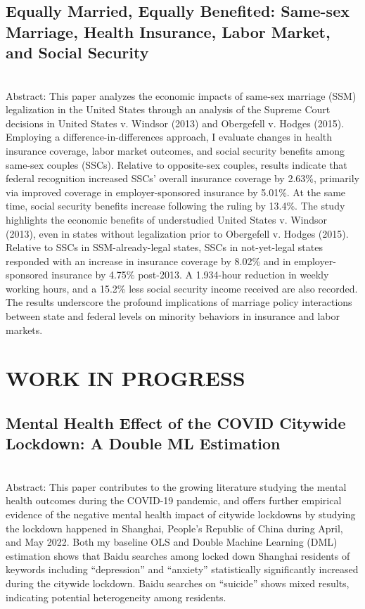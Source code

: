 \documentclass[a4paper,9pt]{extarticle}
\begin{document}
\subsection*{Equally Married, Equally Benefited: Same-sex Marriage, Health Insurance, Labor Market, and Social Security} \\ 
Abstract: This paper analyzes the economic impacts of same-sex marriage (SSM) legalization in the United States through an analysis of the Supreme Court decisions in United States v. Windsor (2013) and Obergefell v. Hodges (2015). Employing a difference-in-differences approach, I evaluate changes in health insurance coverage, labor market outcomes, and social security benefits among same-sex couples (SSCs). Relative to opposite-sex couples, results indicate that federal recognition increased SSCs’ overall insurance coverage by 2.63\%, primarily via improved coverage in employer-sponsored insurance by 5.01\%. At the same time, social security benefits increase following the ruling by 13.4\%. The study highlights the economic benefits of understudied United States v. Windsor (2013), even in states without legalization prior to Obergefell v. Hodges (2015). Relative to SSCs in SSM-already-legal states, SSCs in not-yet-legal states responded with an increase in insurance coverage by 8.02\% and in employer-sponsored insurance by 4.75\% post-2013. A 1.934-hour reduction in weekly working hours, and a 15.2\% less social security income received are also recorded. The results underscore the profound implications of marriage policy interactions between state and federal levels on minority behaviors in insurance and labor markets. \\


\section*{WORK IN PROGRESS}

\subsection*{Mental Health Effect of the COVID Citywide Lockdown: A Double ML Estimation} \\ 

Abstract: This paper contributes to the growing literature studying the mental health outcomes during the COVID-19 pandemic, and offers further empirical evidence of the negative mental health impact of citywide lockdowns by studying the lockdown happened in Shanghai, People’s Republic of China during April, and May 2022. Both my baseline OLS and Double Machine Learning (DML) estimation shows that Baidu searches among locked down Shanghai residents of keywords including “depression” and “anxiety” statistically significantly increased during the citywide lockdown. Baidu searches on “suicide” shows mixed results, indicating potential heterogeneity among residents. \\
\end{document}
